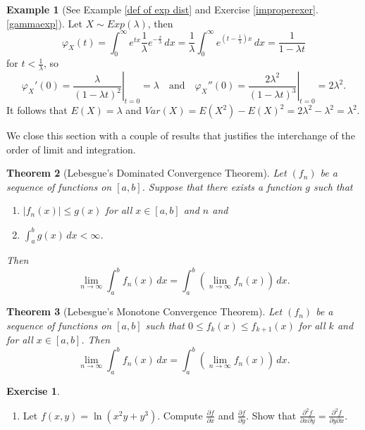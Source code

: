 \documentclass[12pt,letterpaper]{book}
\numberwithin{equation}{section}
\newtheorem{thm}{\textbf{Theorem}}[section]
\theoremstyle{definition}
\newtheorem{example}[thm]{\textbf{Example}}
\newtheorem{exercise}{\textbf{Exercise}}[chapter]
\begin{document}
\begin{example}[See Example \ref{def of exp dist} and Exercise \ref{improperexer}.\ref{gammaexp}] Let $X\sim Exp(\lambda)$, then
$$\varphi_X(t)=\int_0^\infty e^{tx}\frac{1}{\lambda}e^{-\frac{x}{\lambda}}\,dx=\frac{1}{\lambda}\int_0^\infty e^{(t-\frac{1}{\lambda})x}\,dx=\frac{1}{1-\lambda t} $$
for $t<\frac{1}{\lambda}$, so
$$\varphi_X'(0)=\left.\frac{\lambda}{(1-\lambda t)^2}\right|_{t=0}=\lambda\quad\text{and}\quad \varphi_X''(0)=\left.\frac{2\lambda^2}{(1-\lambda t)^3}\right|_{t=0}=2\lambda^2.$$
It follows that $E(X)=\lambda$ and $Var(X)=E(X^2)-E(X)^2=2\lambda^2-\lambda^2=\lambda^2$.
\end{example}

We close this section with a couple of results that justifies the interchange of the order of limit and integration.

\begin{thm}[Lebesgue's Dominated Convergence Theorem]
Let $(f_n)$ be a sequence of functions on $[a,b]$. Suppose that there exists a function $g$ such that
\begin{enumerate}
\item $|f_n(x)|\leq g(x)$ for all $x\in [a,b]$ and $n$ and
\item $\displaystyle{\int_{a}^b} g(x)\,dx<\infty$.
\end{enumerate}
Then $$\lim_{n\to \infty}\int_a^b f_n(x)\,dx=\int_a^b \left(\lim_{n\to \infty}f_n(x)\right)\,dx.$$
\end{thm}

\begin{thm}[Lebesgue's Monotone Convergence Theorem]
Let $(f_n)$ be a sequence of functions on $[a,b]$ such that $0\leq f_k(x) \leq f_{k+1}(x)$ for all $k$ and for all $x\in [a,b]$. Then $$\lim_{n\to \infty}\int_a^b f_n(x)\,dx=\int_a^b \left(\lim_{n\to \infty}f_n(x)\right)\,dx.$$
\end{thm}

\begin{exercise}\quad
\begin{enumerate}[\bfseries 1.]
\item Let $f(x,y)=\ln (x^2y+y^3)$. Compute $\frac{\partial f}{\partial x}$ and $\frac{\partial f}{\partial y}$. Show that $\frac{\partial^2 f}{\partial x\partial y}=\frac{\partial^2 f}{\partial y\partial x}$.
\end{enumerate}
\end{exercise}
\end{document}
